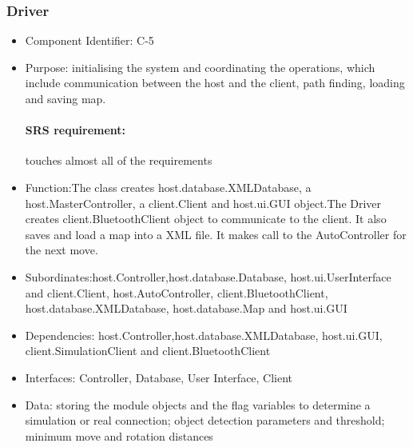 \documentclass[11pt, a4paper]{report}
\begin{document}
\subsubsection{Driver}
\begin{itemize}
\item Component Identifier: C-5
\item Purpose: initialising the system and coordinating the operations,
which include communication between the host and the client, path finding,
loading and saving map.
\paragraph{SRS requirement:} touches almost all of the requirements
\item Function:The class creates host.database.XMLDatabase, a host.MasterController,
a client.Client and host.ui.GUI object.The Driver creates client.BluetoothClient object to communicate to the client. It also saves and load a map
 into a XML file. It makes call to the AutoController for the next move.
\item Subordinates:host.Controller,host.database.Database, host.ui.UserInterface and
 client.Client, host.AutoController, client.BluetoothClient,
host.database.XMLDatabase, host.database.Map and host.ui.GUI
\item Dependencies: host.Controller,host.database.XMLDatabase, host.ui.GUI,
 client.SimulationClient and client.BluetoothClient
\item Interfaces: Controller, Database, User Interface, Client
\item Data: storing the module objects and the flag variables to determine a simulation
or real connection; object detection parameters and threshold; minimum move and rotation distances
\end{itemize}
\end{document}
